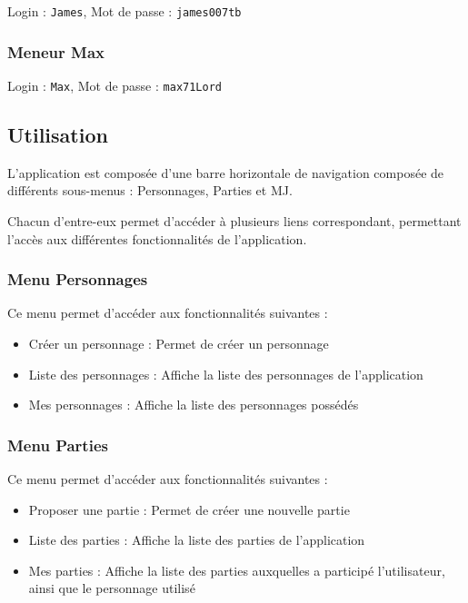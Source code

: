 \documentclass[a4paper, 11pt, titlepage]{article}
\begin{document}
Login : \lstinline!James!, Mot de passe : \lstinline!james007tb!


\subsubsection {Meneur Max}

Login : \lstinline!Max!, Mot de passe : \lstinline!max71Lord!




\subsection {Utilisation}

L'application est composée d'une barre horizontale de navigation composée de différents sous-menus : Personnages, Parties et MJ.

Chacun d'entre-eux permet d'accéder à plusieurs liens correspondant, permettant l'accès aux différentes fonctionnalités de l'application.


\subsubsection {Menu Personnages}

Ce menu permet d'accéder aux fonctionnalités suivantes :

\begin{itemize}
\item
Créer un personnage : Permet de créer un personnage

\item
Liste des personnages : Affiche la liste des personnages de l'application

\item
Mes personnages : Affiche la liste des personnages possédés

\end{itemize}


\subsubsection {Menu Parties}

Ce menu permet d'accéder aux fonctionnalités suivantes :

\begin{itemize}
\item
Proposer une partie : Permet de créer une nouvelle partie

\item
Liste des parties : Affiche la liste des parties de l'application

\item
Mes parties : Affiche la liste des parties auxquelles a participé l'utilisateur, ainsi que le personnage utilisé

\end{itemize}
\end{document}
